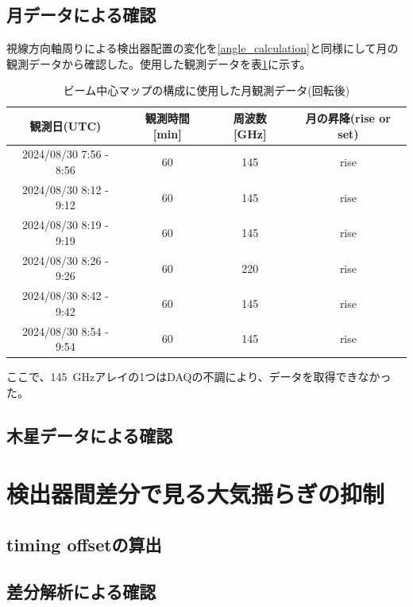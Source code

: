 \subsection{月データによる確認}
\label{moon_ana}
視線方向軸周りによる検出器配置の変化を\ref{angle_calculation}と同様にして月の観測データから確認した。使用した観測データを表\ref{after_full_array_table}に示す。
\begin{table}[htbp]
  \centering
  \caption{ビーム中心マップの構成に使用した月観測データ(回転後)}
  \vspace{3mm}
  \begin{tabular}{cccc} \hline
    観測日(UTC) & 観測時間 [min] & 周波数 [GHz] & 月の昇降(rise or set) \\ \hline
    2024/08/30 7:56 - 8:56 & 60 & 145 & rise \\
    2024/08/30 8:12 - 9:12 & 60 & 145 & rise \\
    2024/08/30 8:19 - 9:19 & 60 & 145 & rise \\
    2024/08/30 8:26 - 9:26 & 60 & 220 & rise \\
    2024/08/30 8:42 - 9:42 & 60 & 145 & rise \\
    2024/08/30 8:54 - 9:54 & 60 & 145 & rise \\ \hline

  \end{tabular}
  \label{after_full_array_table}
\end{table}
ここで、\SI{145}{GHz}アレイの1つはDAQの不調により、データを取得できなかった。

\subsection{木星データによる確認}
\label{jupiter_ana}

\section{検出器間差分で見る大気揺らぎの抑制}

\subsection{timing offsetの算出}

\subsection{差分解析による確認}
